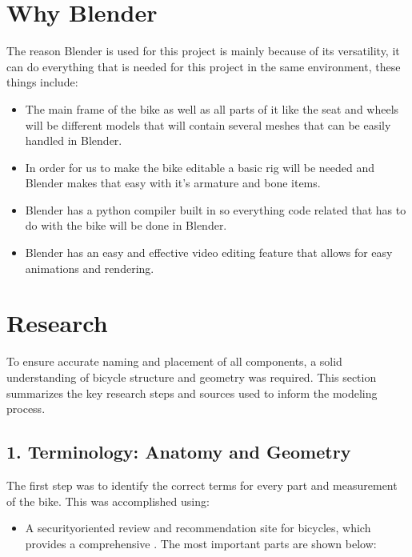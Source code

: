 \documentclass[letterpaper,10pt,english]{jupyterBook}
\begin{document}
\section{Why Blender}
\label{\detokenize{Blender:why-blender}}
\sphinxAtStartPar
The reason Blender is used for this project is mainly because of its versatility, it can do everything that is needed for this project in the same environment, these things include:
\begin{itemize}
\item {} 
\sphinxAtStartPar
{} The main frame of the bike as well as all parts of it like the seat and wheels will be different models that will contain several meshes that can be easily handled in Blender.

\item {} 
\sphinxAtStartPar
{} In order for us to make the bike editable a basic rig will be needed and Blender makes that easy with it’s armature and bone items.

\item {} 
\sphinxAtStartPar
{} Blender has a python compiler built in so everything code related that has to do with the bike will be done in Blender.

\item {} 
\sphinxAtStartPar
{} Blender has an easy and effective video editing feature that allows for easy animations and rendering.

\end{itemize}

\sphinxstepscope


\section{Research}
\label{\detokenize{Research:research}}\label{\detokenize{Research::doc}}
\sphinxAtStartPar
To ensure accurate naming and placement of all components, a solid understanding of bicycle structure and geometry was required. This section summarizes the key research steps and sources used to inform the modeling process.


\subsection{1. Terminology: Anatomy and Geometry}
\label{\detokenize{Research:terminology-anatomy-and-geometry}}
\sphinxAtStartPar
The first step was to identify the correct terms for every part and measurement of the bike. This was accomplished using:
\begin{itemize}
\item {} 
\sphinxAtStartPar
{} A security\sphinxhyphen{}oriented review and recommendation site for bicycles, which provides a comprehensive . The most important parts are shown below:

\end{itemize}
\end{document}
